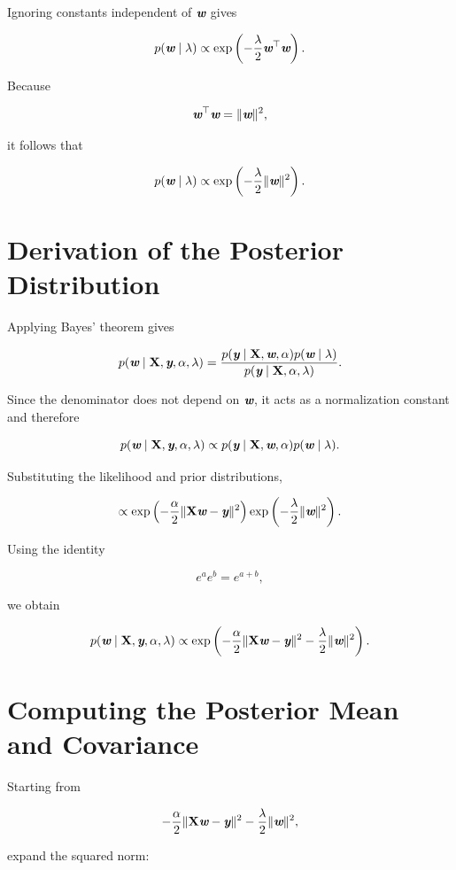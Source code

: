 \documentclass[14pt]{extarticle}
\def\mathbi#1{\textbf{\em #1}}
\begin{document}
Ignoring constants independent of $\mathbi{w}$ gives

\[
p(\mathbi{w}\mid\lambda)
\propto
\exp
\left(
-\frac{\lambda}{2}
\mathbi{w}^\top\mathbi{w}
\right).
\]

Because

\[
\mathbi{w}^\top\mathbi{w}
=
\|\mathbi{w}\|^2,
\]

it follows that

\[
p(\mathbi{w}\mid\lambda)
\propto
\exp
\left(
-\frac{\lambda}{2}
\|\mathbi{w}\|^2
\right).
\]

\section*{Derivation of the Posterior Distribution}

Applying Bayes' theorem gives

\[
p(\mathbi{w}\mid\mathbf{X},\mathbi{y},\alpha,\lambda)
=
\frac{
p(\mathbi{y}\mid\mathbf{X},\mathbi{w},\alpha)
p(\mathbi{w}\mid\lambda)
}{
p(\mathbi{y}\mid\mathbf{X},\alpha,\lambda)
}.
\]

Since the denominator does not depend on $\mathbi{w}$, it acts as a normalization constant and therefore

\[
p(\mathbi{w}\mid\mathbf{X},\mathbi{y},\alpha,\lambda)
\propto
p(\mathbi{y}\mid\mathbf{X},\mathbi{w},\alpha)
p(\mathbi{w}\mid\lambda).
\]

Substituting the likelihood and prior distributions,

\[
\propto
\exp
\left(
-\frac{\alpha}{2}
\|\mathbf{X}\mathbi{w}-\mathbi{y}\|^2
\right)
\exp
\left(
-\frac{\lambda}{2}
\|\mathbi{w}\|^2
\right).
\]

Using the identity

\[
e^a e^b
=
e^{a+b},
\]

we obtain

\[
p(\mathbi{w}\mid\mathbf{X},\mathbi{y},\alpha,\lambda)
\propto
\exp
\left(
-\frac{\alpha}{2}
\|\mathbf{X}\mathbi{w}-\mathbi{y}\|^2
-
\frac{\lambda}{2}
\|\mathbi{w}\|^2
\right).
\]

\section*{Computing the Posterior Mean and Covariance}

Starting from

\[
-\frac{\alpha}{2}
\|\mathbf{X}\mathbi{w}-\mathbi{y}\|^2
-
\frac{\lambda}{2}
\|\mathbi{w}\|^2,
\]

expand the squared norm:
\end{document}
